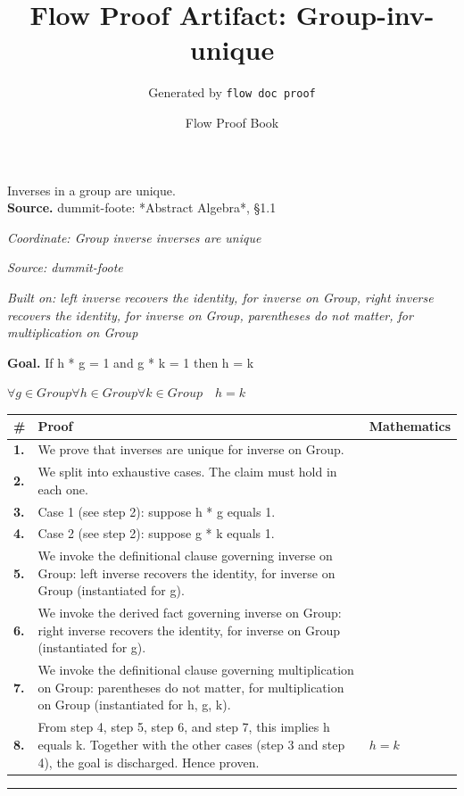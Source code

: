 \documentclass[11pt]{article}
\title{Flow Proof Artifact: Group-inv-unique}
\author{Generated by \texttt{flow doc proof}}
\date{Flow Proof Book}
\theoremstyle{definition}
\begin{document}
\maketitle
Inverses in a group are unique.\\[0.5em]
\textbf{Source.} dummit-foote: *Abstract Algebra*, §1.1\\[0.5em]
\bigskip
{}\par
\smallskip\noindent\textit{Coordinate: Group \cdot inverse \cdot inverses are unique}\par
\smallskip\noindent\textit{Source: dummit-foote}\par
\smallskip\noindent\textit{Built on: left inverse recovers the identity, for inverse on Group, right inverse recovers the identity, for inverse on Group, parentheses do not matter, for multiplication on Group}\par
\medskip
\noindent\textbf{Goal.} If h * g = 1 and g * k = 1 then h = k\par
\noindent$\displaystyle \forall g \in Group \forall h \in Group \forall k \in Group\quad h = k$\par
\medskip
\noindent
\begin{tabular}{@{} >{\raggedright\arraybackslash}p{} >{\raggedright\arraybackslash}p{} >{\raggedleft\arraybackslash}p{} @{}}
\textbf{\#} & \textbf{Proof} & \textbf{Mathematics} \\
\midrule
\textbf{1.} & We prove that inverses are unique for inverse on Group. & \\[0.45em]
\textbf{2.} & We split into exhaustive cases. The claim must hold in each one. & \\[0.45em]
\textbf{3.} & Case 1 (see step 2): suppose h * g  equals  1. & \\[0.45em]
\textbf{4.} & Case 2 (see step 2): suppose g * k  equals  1. & \\[0.45em]
\textbf{5.} & We invoke the definitional clause governing inverse on Group: left inverse recovers the identity, for inverse on Group (instantiated for g). & \\[0.45em]
\textbf{6.} & We invoke the derived fact governing inverse on Group: right inverse recovers the identity, for inverse on Group (instantiated for g). & \\[0.45em]
\textbf{7.} & We invoke the definitional clause governing multiplication on Group: parentheses do not matter, for multiplication on Group (instantiated for h, g, k). & \\[0.45em]
\textbf{8.} & From step 4, step 5, step 6, and step 7, this implies h equals k. Together with the other cases (step 3 and step 4), the goal is discharged. Hence proven. & $\displaystyle h = k$ \\[0.45em]
\bottomrule
\end{tabular}
\label{thm:Group-inverse-inverses_are_unique}
\par\medskip\hrule
\end{document}
